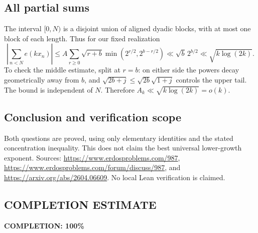 \subsection*{All partial sums}
The interval $[0,N)$ is a disjoint union of aligned dyadic blocks, with at most one block of each length. Thus for our fixed realization
\[
 \left|\sum_{n<N}e(kx_n)\right|
 \le A\sum_{r\ge0}\sqrt{r+b}\min(2^{r/2},2^{b-r/2})
 \ll\sqrt b\,2^{b/2}\ll\sqrt{k\log(2k)}.
\]
To check the middle estimate, split at $r=b$: on either side the powers decay geometrically away from $b$, and $\sqrt{2b+j}\le\sqrt{2b}\sqrt{1+j}$ controls the upper tail. The bound is independent of $N$. Therefore $A_k\ll\sqrt{k\log(2k)}=o(k)$.

\subsection*{Conclusion and verification scope}
Both questions are proved, using only elementary identities and the stated concentration inequality. This does not claim the best universal lower-growth exponent. Sources: \url{https://www.erdosproblems.com/987}, \url{https://www.erdosproblems.com/forum/discuss/987}, and \url{https://arxiv.org/abs/2604.06609}. No local Lean verification is claimed.
\subsection*{COMPLETION ESTIMATE}
\textbf{COMPLETION: 100\%}
